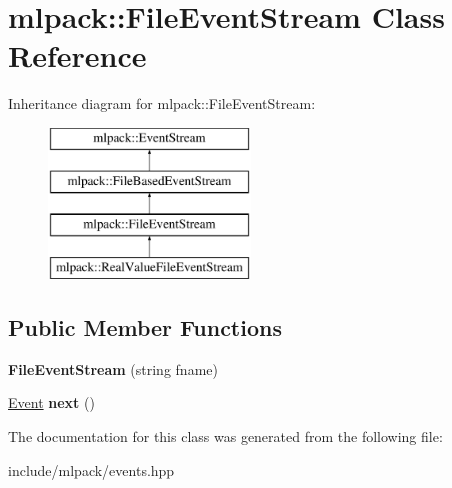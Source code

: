 \hypertarget{classmlpack_1_1_file_event_stream}{
\section{mlpack::FileEventStream Class Reference}
\label{classmlpack_1_1_file_event_stream}
}
Inheritance diagram for mlpack::FileEventStream:\begin{figure}[H]
\begin{center}
\leavevmode
\includegraphics[height=4.000000cm]{classmlpack_1_1_file_event_stream}
\end{center}
\end{figure}
\subsection*{Public Member Functions}
\begin{DoxyCompactItemize}
\item 
\hypertarget{classmlpack_1_1_file_event_stream_ab4fdb0b43ef647c62888d583210a4f40}{
{\bfseries FileEventStream} (string fname)}
\label{classmlpack_1_1_file_event_stream_ab4fdb0b43ef647c62888d583210a4f40}

\item 
\hypertarget{classmlpack_1_1_file_event_stream_a13a65fd63969c2e662d3eec17df57edf}{
\hyperlink{structmlpack_1_1_event}{Event} {\bfseries next} ()}
\label{classmlpack_1_1_file_event_stream_a13a65fd63969c2e662d3eec17df57edf}

\end{DoxyCompactItemize}


The documentation for this class was generated from the following file:\begin{DoxyCompactItemize}
\item 
include/mlpack/events.hpp\end{DoxyCompactItemize}

